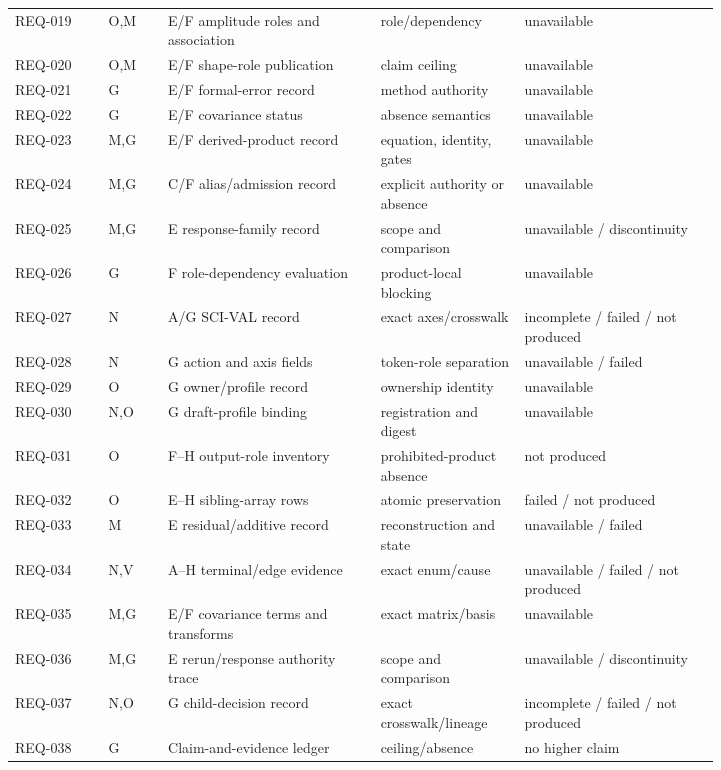 \documentclass[11pt]{article}
\begin{document}
{\begin{longtable}{@{}P{0.11\linewidth}P{0.07\linewidth}P{0.25\linewidth}P{0.16\linewidth}P{0.23\linewidth}@{}}
REQ-019 & O,M & E/F amplitude roles and association & role/dependency & unavailable \\
REQ-020 & O,M & E/F shape-role publication & claim ceiling & unavailable \\
REQ-021 & G & E/F formal-error record & method authority & unavailable \\
REQ-022 & G & E/F covariance status & absence semantics & unavailable \\
REQ-023 & M,G & E/F derived-product record & equation, identity, gates & unavailable \\
REQ-024 & M,G & C/F alias/admission record & explicit authority or absence & unavailable \\
REQ-025 & M,G & E response-family record & scope and comparison & unavailable / discontinuity \\
REQ-026 & G & F role-dependency evaluation & product-local blocking & unavailable \\
REQ-027 & N & A/G SCI-VAL record & exact axes/crosswalk & incomplete / failed / not produced \\
REQ-028 & N & G action and axis fields & token-role separation & unavailable / failed \\
REQ-029 & O & G owner/profile record & ownership identity & unavailable \\
REQ-030 & N,O & G draft-profile binding & registration and digest & unavailable \\
REQ-031 & O & F--H output-role inventory & prohibited-product absence & not produced \\
REQ-032 & O & E--H sibling-array rows & atomic preservation & failed / not produced \\
REQ-033 & M & E residual/additive record & reconstruction and state & unavailable / failed \\
REQ-034 & N,V & A--H terminal/edge evidence & exact enum/cause & unavailable / failed / not produced \\
REQ-035 & M,G & E/F covariance terms and transforms & exact matrix/basis & unavailable \\
REQ-036 & M,G & E rerun/response authority trace & scope and comparison & unavailable / discontinuity \\
REQ-037 & N,O & G child-decision record & exact crosswalk/lineage & incomplete / failed / not produced \\
REQ-038 & G & Claim-and-evidence ledger & ceiling/absence & no higher claim \\
\bottomrule
\end{longtable}
}
\end{document}
